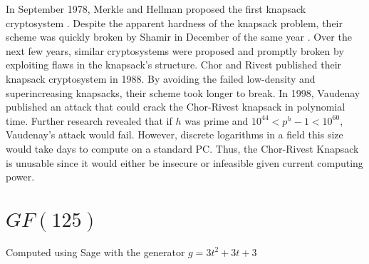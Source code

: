 \documentclass[12pt,a4paper,titlepage]{article}
\begin{document}
In September 1978, Merkle and Hellman proposed the first knapsack cryptosystem \cite{Merkle:10}. Despite the apparent hardness of the knapsack problem, their scheme was quickly broken by Shamir in December of the same year \cite{Shamir:11}. Over the next few years, similar cryptosystems were proposed and promptly broken by exploiting flaws in the knapsack's structure. Chor and Rivest published their knapsack cryptosystem in 1988. By avoiding the failed low-density and superincreasing knapsacks, their scheme took longer to break. In 1998, Vaudenay published an attack that could crack the Chor-Rivest knapsack in polynomial time.  Further research \cite{safer:4} revealed that if $h$ was prime and $10^{44} < p^h - 1 < 10^{60}$, Vaudenay's attack would fail. However, discrete logarithms in a field this size would take days to compute on a standard PC. Thus, the Chor-Rivest Knapsack is unusable since it would either be insecure or infeasible given current computing power.

\newpage




\newpage

\section{$GF(125)$}

\centerline{Computed using Sage with the generator $g = 3t^2 + 3t + 3$}
\end{document}
